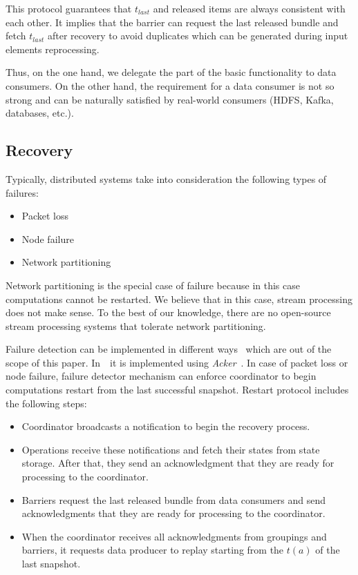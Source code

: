 This protocol guarantees that $t_{last}$ and released items are always consistent with each other. It implies that the barrier can request the last released bundle and fetch $t_{last}$ after recovery to avoid duplicates which can be generated during input elements reprocessing.

Thus, on the one hand, we delegate the part of the basic functionality to data consumers. On the other hand, the requirement for a data consumer is not so strong and can be naturally satisfied by real-world consumers (HDFS, Kafka, databases, etc.). 

\subsection{Recovery}

Typically, distributed systems take into consideration the following types of failures:
\begin{itemize}
    \item Packet loss
    \item Node failure
    \item Network partitioning
\end{itemize}

Network partitioning is the special case of failure because in this case computations cannot be restarted. We believe that in this case, stream processing does not make sense. To the best of our knowledge, there are no open-source stream processing systems that tolerate network partitioning.

Failure detection can be implemented in different ways~\cite{hayashibara2002failure} which are out of the scope of this paper. In~\FlameStream\ it is implemented using {\em Acker}~\cite{we2018adbis}. In case of packet loss or node failure, failure detector mechanism can enforce coordinator to begin computations restart from the last successful snapshot. Restart protocol includes the following steps:

\begin{itemize}
    \item Coordinator broadcasts a notification to begin the recovery process.
    \item Operations receive these notifications and fetch their states from state storage. After that, they send an acknowledgment that they are ready for processing to the coordinator.
    \item Barriers request the last released bundle from data consumers and send acknowledgments that they are ready for processing to the coordinator.
    \item When the coordinator receives all acknowledgments from groupings and barriers, it requests data producer to replay starting from the $t(a)$ of the last snapshot.
\end{itemize}

